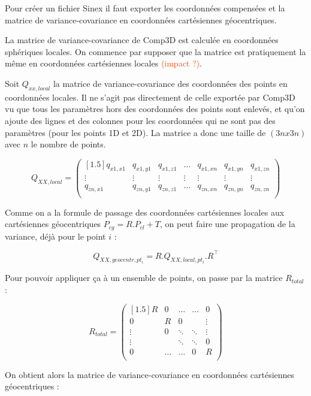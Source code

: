 \documentclass[french]{report}
\newcommand{\revoir}[1]{\textcolor{OrangeRed}{#1}}
\begin{document}
Pour créer un fichier Sinex il faut exporter les coordonnées compensées et la matrice de variance-covariance en coordonnées cartésiennes géocentriques.

La matrice de variance-covariance de Comp3D est calculée en coordonnées sphériques locales. On commence par supposer que la matrice est
pratiquement la même en coordonnées cartésiennes locales \revoir{(impact ?)}.

Soit $Q_{xx,local}$ la matrice de variance-covariance des coordonnées des points en coordonnées locales.
Il ne s'agit pas directement de celle exportée par Comp3D vu que tous les paramètres hors des coordonnées des points sont enlevés, et qu'on ajoute
des lignes et des colonnes pour les coordonnées qui ne sont pas des paramètres (pour les points 1D et 2D). La matrice a donc une taille de $(3n x 3n)$ avec $n$ le nombre de points.

$$Q_{XX,local}=\begin{pmatrix}[1.5]
	 q_{x1,x1} &  q_{x1,y1} & q_{x1,z1} & \dots & q_{x1,xn} & q_{x1,yn} & q_{x1,zn} \\
	  \vdots   &  \vdots   &  \vdots   &  \vdots   &  \vdots   &  \vdots   &  \vdots \\
     q_{zn,x1} &  q_{zn,y1} & q_{zn,z1} & \dots & q_{zn,xn} & q_{zn,yn} & q_{zn,zn} \\ \end{pmatrix}$$

Comme on a la formule de passage des coordonnées cartésiennes locales aux cartésiennes géocentriques $P_{cg} = R . P_{cl}  + T$,
on peut faire une propagation de la variance, déjà pour le point $i$ :

$$Q_{XX,geocentr,pt_i} = R . Q_{XX,local,pt_i} . R^{\top}$$

Pour pouvoir appliquer ça à un ensemble de points, on passe par la matrice $R_{total}$ :

$$R_{total}=\begin{pmatrix}[1.5]
    R & 0 & \dots & \dots  & 0 \\
    0 & R & 0 &  & \vdots \\
    \vdots & 0 & \ddots & \ddots & \vdots \\
    \vdots &  & \ddots & \ddots & 0 \\
     0 & \dots &  \dots & 0 & R \\ \end{pmatrix}$$

On obtient alors la matrice de variance-covariance en coordonnées cartésiennes géocentriques :
\end{document}
